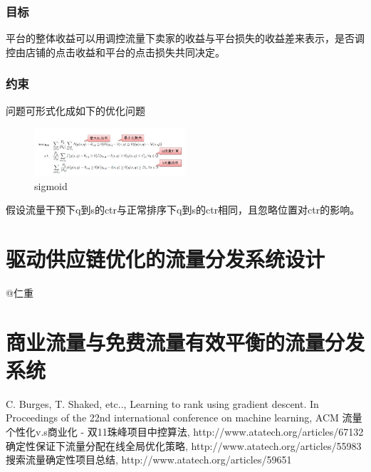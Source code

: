\subsubsection{目标}
平台的整体收益可以用调控流量下卖家的收益与平台损失的收益差来表示，是否调控由店铺的点击收益和平台的点击损失共同决定。
\subsubsection{约束}
问题可形式化成如下的优化问题
\begin{figure}[htbp]
  \centering
  \includegraphics[width=0.5\textwidth]{pic/chap8/cp8p1.jpeg}
  \caption{sigmoid}\label{fig:digit}
\end{figure}
假设流量干预下q到s的ctr与正常排序下q到s的ctr相同，且忽略位置对ctr的影响。

\section{驱动供应链优化的流量分发系统设计} 
@仁重

\section{商业流量与免费流量有效平衡的流量分发系统} 


\begin{thebibliography}{99}
 C. Burges, T. Shaked, etc.., Learning to rank 
using gradient descent. In Proceedings of the 22nd international 
conference on machine learning, ACM
 流量个性化v.s商业化 - 双11珠峰项目中控算法, http://www.atatech.org/articles/67132
 确定性保证下流量分配在线全局优化策略, http://www.atatech.org/articles/55983
 搜索流量确定性项目总结, http://www.atatech.org/articles/59651
\end{thebibliography}

 
